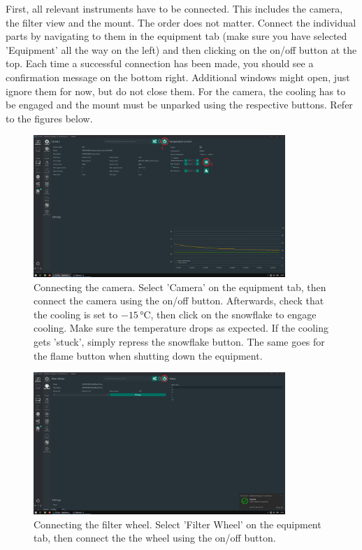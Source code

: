 \documentclass[a4paper, 11pt, fleqn]{memoir}
\begin{document}
First, all relevant instruments have to be connected. This includes the camera, the filter view and the mount. The order does not matter. Connect the individual parts by navigating to them in the equipment tab (make sure you have selected 'Equipment' all the way on the left) and then clicking on the on/off button at the top. Each time a successful connection has been made, you should see a confirmation message on the bottom right. Additional windows might open, just ignore them for now, but do not close them. For the camera, the cooling has to be engaged and the mount must be unparked using the respective buttons. Refer to the figures below.
\begin{figure}
    \centering
    \includegraphics[width=0.85\textwidth]{figures/NINA/CameraDP.png}
    \caption{Connecting the camera. Select 'Camera' on the equipment tab, then connect the camera using the on/off button. Afterwards, check that the cooling is set to $-15\,\si{\degreeCelsius}$, then click on the snowflake to engage cooling. Make sure the temperature drops as expected. If the cooling gets 'stuck', simply repress the snowflake button. The same goes for the flame button when shutting down the equipment.
    }
    \label{fig:NINA:Camera Connection}
\end{figure}

\begin{figure}
    \centering
    \includegraphics[width=0.85\textwidth]{figures/NINA/FilterDP.png}
    \caption{Connecting the filter wheel. Select 'Filter Wheel' on the equipment tab, then connect the the wheel using the on/off button.
    }
    \label{fig:NINA:Filter Connection}
\end{figure}
\end{document}
